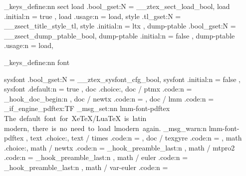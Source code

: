 \ztex_keys_define:nn { sect }{
  load          .bool_gset:N  = \g__ztex_sect_load_bool,
  load          .initial:n    = { true },
  load          .usage:n      = load,
  style         .tl_gset:N    = \g__zsect_title_style_tl,
  style         .initial:n    = { ltx },
  dump-ptable   .bool_gset:N  = \g__zsect_dump_ptable_bool,
  dump-ptable   .initial:n    = { false },
  dump-ptable   .usage:n      = load,
}


\ztex_keys_define:nn { font }{
  sysfont         .bool_gset:N  = \g__ztex_sysfont_cfg_bool,
  sysfont         .initial:n    = { false },
  sysfont         .default:n    = { true },
  doc             .choice:,
  doc / ptmx      .code:n       = {
    \RequirePackage{mathptmx}
    \RequirePackage{newtxtext}
    \ztex_hook_doc_begin:n
      {
        \let\pi\new@pi
        \let\jmath\new@jmath
        \let\amalg\new@amalg
        \let\coprod\new@coprod
      }
  },
  doc / newtx    .code:n       = {
    \RequirePackage{newtxtext}
    \RequirePackage{newtxmath}
  },
  doc / lmm       .code:n      = {
    \sys_if_engine_pdftex:TF 
      { 
        \RequirePackage{lmodern}
        \RequirePackage{fixcmex} 
      }{ 
        \ztex_msg_set:nn {lmm-font-pdftex}
          {
            The~default~font~for~XeTeX/LuaTeX~is~latin~
            modern,~there~is~no~need~to~load~lmodern~again.
          }
        \ztex_msg_warn:n {lmm-font-pdftex} 
      }
  },
  text            .choice:,
  text / times    .code:n       = { \RequirePackage{newtxtext} },
  doc / texgyre   .code:n       = {  },  %
  math            .choice:,
  math / newtx    .code:n       = {
    \ztex_hook_preamble_last:n { \RequirePackage{newtxmath} } 
  },
  math / mtpro2   .code:n       = { 
    \ztex_hook_preamble_last:n { 
    } 
  },
  math / euler    .code:n       = { 
    \ztex_hook_preamble_last:n {  } 
  },
  math / var-euler .code:n       = {
    \usepackage[OT1]{eulervm}
}}
